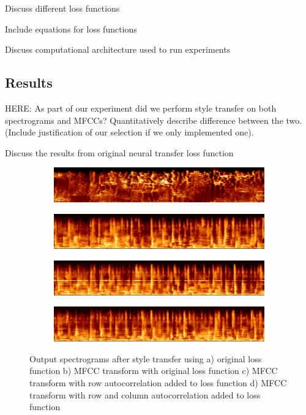 \documentclass{article}
\begin{document}
Discuss different loss functions

Include equations for loss functions

Discuss computational architecture used to run experiments

\subsection{Results}

HERE: As part of our experiment did we perform style transfer on both spectrograms and MFCCs? Quantitatively describe difference between the two. (Include justification of our selection if we only implemented one).

Discuss the results from original neural transfer loss function

\begin{figure}[h]
\begin{subfigure}{\textwidth}
  \centering
  \includegraphics[width = \textwidth]{out1_spec}
  \caption{}
\end{subfigure}
\begin{subfigure}{\textwidth}
  \centering
  \includegraphics[width = \textwidth]{out2_spec}
  \caption{}
\end{subfigure}
\begin{subfigure}{\textwidth}
  \centering
  \includegraphics[width = \textwidth]{out3_spec}
  \caption{}
\end{subfigure}
\begin{subfigure}{\textwidth}
  \centering
  \includegraphics[width = \textwidth]{out4_spec}
  \caption{}
\end{subfigure}
\caption{Output spectrograms after style transfer using a) original loss function b) MFCC transform with original loss function c) MFCC transform with row autocorrelation added to loss function d) MFCC transform with row and column autocorrelation added to loss function}
\end{figure}
\end{document}
